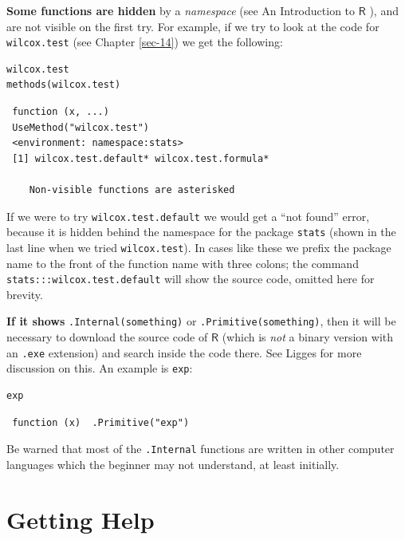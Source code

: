 \documentclass[captions=tableheading]{scrbook}
\begin{document}
\textbf{Some functions are hidden} by a \emph{namespace} (see An Introduction to \(\mathsf{R}\) \cite{Venables2010}), and are not visible on the first try. For example, if we try to look at the code for \texttt{wilcox.test} (see Chapter \ref{sec-14}) we get the following:


\lstset{language=R}
\begin{lstlisting}
wilcox.test
methods(wilcox.test)
\end{lstlisting}

\begin{verbatim}
 function (x, ...) 
 UseMethod("wilcox.test")
 <environment: namespace:stats>
 [1] wilcox.test.default* wilcox.test.formula*
 
    Non-visible functions are asterisked
\end{verbatim}

If we were to try \texttt{wilcox.test.default}  we would get a ``not found'' error, because it is hidden behind the namespace for the package \texttt{stats} (shown in the last line when we tried \texttt{wilcox.test}). In cases like these we prefix the package name to the front of the function name with three colons; the command \texttt{stats:::wilcox.test.default} will show the source code, omitted here for brevity.

\textbf{If it shows} \texttt{.Internal(something)} or \texttt{.Primitive(something)}, then it will be necessary to download the source code of \(\mathsf{R}\) (which is \emph{not} a binary version with an \texttt{.exe} extension) and search inside the code there. See Ligges \cite{Ligges2006} for more discussion on this. An example is \texttt{exp}:


\lstset{language=R}
\begin{lstlisting}
exp
\end{lstlisting}

\begin{verbatim}
 function (x)  .Primitive("exp")
\end{verbatim}

Be warned that most of the \texttt{.Internal} functions are written in other computer languages which the beginner may not understand, at least initially.
\section{Getting Help}
\label{sec-2-4}
\label{sec-Getting-Help}
\end{document}
